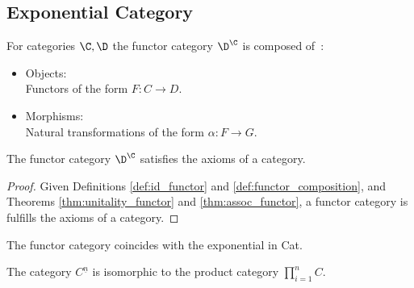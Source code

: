 \subsection*{Exponential Category}
\begin{definition}\label{def:functor_category}
  For categories $\C, \D$ the functor category $\D^\C$ is composed
  of~\parencite[p.~30]{leinster:basic_category_theory}:

  \begin{itemize}
    \item Objects:\\
      Functors of the form $F:C\to D$.
    \item Morphisms:\\
      Natural transformations of the form $\alpha:F\to G$.
  \end{itemize}
\end{definition}

\begin{theorem}
  The functor category $\D^\C$ satisfies the axioms of a category.

  \begin{proof}
    Given Definitions \ref{def:id_functor} and \ref{def:functor_composition},
    and Theorems \ref{thm:unitality_functor} and \ref{thm:assoc_functor}, a
    functor category is fulfills the axioms of a category.
  \end{proof}
\end{theorem}

\begin{remark}
  The functor category coincides with the exponential in Cat.
\end{remark}

\begin{remark}
  The category $C^{\underline{n}}$ is isomorphic to the product category
  $\prod_{i=1}^n C$.
\end{remark}